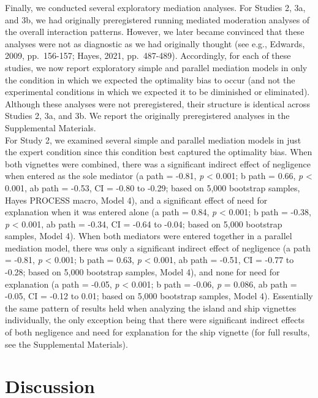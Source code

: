 \documentclass[
  man,floatsintext]{apa6}
\begin{document}
Finally, we conducted several exploratory mediation analyses. For Studies 2, 3a, and 3b, we had originally preregistered running mediated moderation analyses of the overall interaction patterns. However, we later became convinced that these analyses were not as diagnostic as we had originally thought (see e.g., Edwards, 2009, pp.~156-157; Hayes, 2021, pp.~487-489). Accordingly, for each of these studies, we now report exploratory simple and parallel mediation models in only the condition in which we expected the optimality bias to occur (and not the experimental conditions in which we expected it to be diminished or eliminated). Although these analyses were not preregistered, their structure is identical across Studies 2, 3a, and 3b. We report the originally preregistered analyses in the Supplemental Materials.\\
For Study 2, we examined several simple and parallel mediation models in just the expert condition since this condition best captured the optimality bias. When both vignettes were combined, there was a significant indirect effect of negligence when entered as the sole mediator (a path = -0.81, \emph{p} \textless{} 0.001; b path = 0.66, \emph{p} \textless{} 0.001, ab path = -0.53, CI = -0.80 to -0.29; based on 5,000 bootstrap samples, Hayes PROCESS macro, Model 4), and a significant effect of need for explanation when it was entered alone (a path = 0.84, \emph{p} \textless{} 0.001; b path = -0.38, \emph{p} \textless{} 0.001, ab path = -0.34, CI = -0.64 to -0.04; based on 5,000 bootstrap samples, Model 4). When both mediators were entered together in a parallel mediation model, there was only a significant indirect effect of negligence (a path = -0.81, \emph{p} \textless{} 0.001; b path = 0.63, \emph{p} \textless{} 0.001, ab path = -0.51, CI = -0.77 to -0.28; based on 5,000 bootstrap samples, Model 4), and none for need for explanation (a path = -0.05, \emph{p} \textless{} 0.001; b path = -0.06, \emph{p} = 0.086, ab path = -0.05, CI = -0.12 to 0.01; based on 5,000 bootstrap samples, Model 4). Essentially the same pattern of results held when analyzing the island and ship vignettes individually, the only exception being that there were significant indirect effects of both negligence and need for explanation for the ship vignette (for full results, see the Supplemental Materials).

\hypertarget{discussion}{%
\section{Discussion}\label{discussion}}
\end{document}
